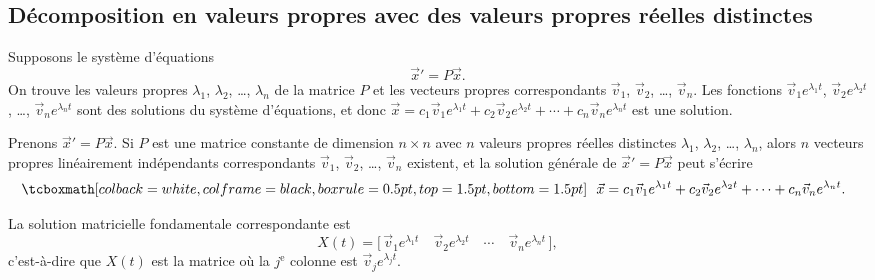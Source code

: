 \subsection{Décomposition en valeurs propres avec des valeurs propres réelles distinctes}

Supposons le système d'équations
\begin{equation*}
{\vec{x}}' = P\vec{x} .
\end{equation*}
On trouve les valeurs propres $\lambda_1$, $\lambda_2$, \ldots, $\lambda_n$
de la matrice $P$ et les vecteurs propres correspondants
$\vec{v}_1$, $\vec{v}_2$, \ldots, $\vec{v}_n$.
Les fonctions
$\vec{v}_1 e^{\lambda_1 t}$, 
$\vec{v}_2 e^{\lambda_2 t}$, \ldots,
$\vec{v}_n e^{\lambda_n t}$ sont des solutions du système d'équations, et donc
$
\vec{x} = c_1 \vec{v}_1 e^{\lambda_1 t} +
c_2 \vec{v}_2 e^{\lambda_2 t} + \cdots +
c_n \vec{v}_n e^{\lambda_n t}
$
est une solution.

\begin{theorem}
Prenons ${\vec{x}}' = P\vec{x}$. Si $P$ est une matrice constante de dimension $n \times n$ avec $n$ valeurs propres réelles distinctes $\lambda_1$, $\lambda_2$, \ldots, $\lambda_n$,
alors $n$ vecteurs propres linéairement indépendants correspondants
$\vec{v}_1$, $\vec{v}_2$, \ldots, $\vec{v}_n$ existent, et la solution générale de
${\vec{x}}' = P\vec{x}$
peut s'écrire
\begin{equation*}
\mybxbg{~~
\vec{x} = c_1 \vec{v}_1 e^{\lambda_1 t} +
c_2 \vec{v}_2 e^{\lambda_2 t} + \cdots +
c_n \vec{v}_n e^{\lambda_n t} .
~~}
\end{equation*}
\end{theorem}

La solution matricielle fondamentale correspondante est
\begin{equation*}
X(t) = \bigl[\, \vec{v}_1 e^{\lambda_1 t} \quad \vec{v}_2 e^{\lambda_2 t}
\quad \cdots \quad \vec{v}_n e^{\lambda_n t} \,\bigr],
\end{equation*}
c'est-à-dire que $X(t)$
est la matrice où la $j^{\text{e}}$ colonne est
$\vec{v}_j e^{\lambda_j t}$.

